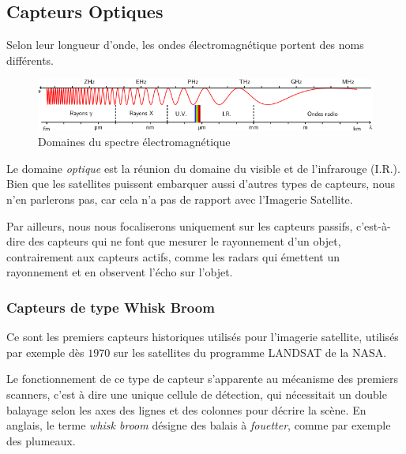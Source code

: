 \documentclass[a4paper, 11pt]{report}
\begin{document}
\subsection{Capteurs Optiques}
Selon leur longueur d'onde, les ondes électromagnétique portent des noms différents.
\begin{figure}[H]
	\begin{center}
		\includegraphics[scale=0.7]{Images/Spectre_Electromagnetique.png}
		\caption{Domaines du spectre électromagnétique}
	\end{center}
\end{figure}
Le domaine \emph{optique} est la réunion du domaine du visible et de l'infrarouge (I.R.).
Bien que les satellites puissent embarquer aussi d'autres types de capteurs, nous n'en parlerons pas, car cela n'a pas de rapport avec l'Imagerie Satellite.

Par ailleurs, nous nous focaliserons uniquement sur les capteurs passifs, c'est-à-dire des capteurs qui ne font que mesurer le rayonnement d'un objet, contrairement aux capteurs actifs, comme les radars qui émettent un rayonnement et en observent l'écho sur l'objet.
\subsubsection{Capteurs de type Whisk Broom}
Ce sont les premiers capteurs historiques utilisés pour l'imagerie satellite, utilisés par exemple dès $1970$ sur les satellites du programme LANDSAT de la NASA.

Le fonctionnement de ce type de capteur s'apparente au mécanisme des premiers scanners, c'est à dire une unique cellule de détection, qui nécessitait un double balayage selon les axes des lignes et des colonnes pour décrire la scène.
En anglais, le terme \emph{whisk broom} désigne des balais à \emph{fouetter}, comme par exemple des plumeaux.
\end{document}
